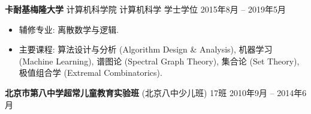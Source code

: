 \documentclass[margin, 10pt]{res-short} %
\begin{document}
\begin{resume}
{\bf 卡耐基梅隆大学}\; 计算机科学院\; 计算机科学\; 学士学位 \hfill 2015年8月 -- 2019年5月
\begin{itemize}
\item 辅修专业: 离散数学与逻辑.
\item 主要课程: 算法设计与分析 (Algorithm Design \& Analysis), 机器学习 (Machine Learning), 谱图论 (Spectral Graph Theory), 集合论 (Set Theory), 极值组合学 (Extremal Combinatorics).
\end{itemize} 

{\bf 北京市第八中学超常儿童教育实验班} (北京八中少儿班) 17班 \hfill 2010年9月 -- 2014年6月 






\end{resume}
\end{document}
